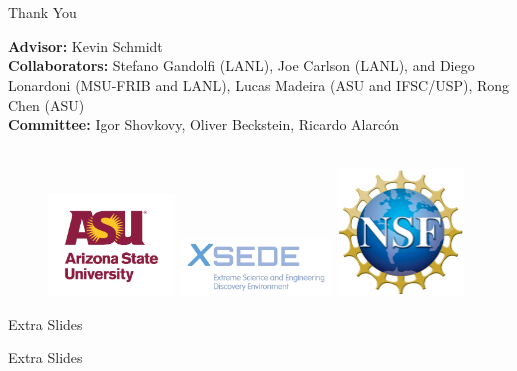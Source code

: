 \documentclass{beamer}
\begin{document}
\section{}
\begin{frame}{Thank You}

{\bf Advisor:} Kevin Schmidt \\
{\bf Collaborators:} Stefano Gandolfi (LANL), Joe Carlson (LANL), and Diego Lonardoni (MSU-FRIB and LANL), Lucas Madeira (ASU and IFSC/USP), Rong Chen (ASU) \\
{\bf Committee:} Igor Shovkovy, Oliver Beckstein, Ricardo Alarc\'on
\\~\\
\begin{figure}[h]
   \centering
   \includegraphics[width=0.30\textwidth]{../figures/asu_university_vert_rgb_maroongold_150.png}
   \includegraphics[width=0.36\textwidth]{../figures/xsede-full-color.jpg}
   \includegraphics[width=0.30\textwidth]{../figures/NSF_4-Color_bitmap_Logo.png}
\end{figure}
\end{frame}

\appendix
\begin{frame}{Extra Slides}
\begin{centering}
   Extra Slides
\end{centering}
\end{frame}
\end{document}
